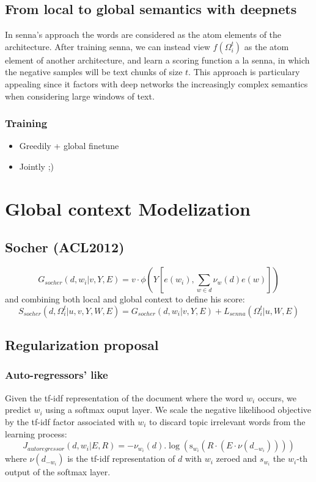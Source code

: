\documentclass[11pt]{article} %
\begin{document}
\subsection{From local to global  semantics with deepnets}
In senna's approach the words are considered as the atom elements of the architecture. After training senna, we can instead view $f(\Omega_i^t)$ as the atom element of another architecture, and learn a scoring function a la senna,
in which the negative samples will be text chunks of size $t$.
This approach is particulary appealing since it factors with deep networks the increasingly complex semantics when considering large windows of text.
\subsubsection{Training}
\begin{itemize}
\item Greedily + global finetune
\item Jointly ;)
\end{itemize}

\section{Global context Modelization}

\subsection{Socher (ACL2012)}
\[G_{socher}(d,w_i| v,Y,E) = v \cdot \phi\left(Y\left[e(w_i),\sum_{w\in d} \nu_w (d) e(w) \right] \right) \]
and combining both local and global context to define his score:
\[ S_{socher}(d, \Omega_{i}^t | u,v,Y,W,E) = G_{socher}(d,w_{i}| v,Y,E)  + L_{senna} \left(\Omega_{i}^t  | u,W,E\right) \]

\subsection{Regularization proposal}
\subsubsection{Auto-regressors' like}
Given the tf-idf representation of the document where the word $w_i$ occurs, we predict $w_i$ using a softmax ouput layer. 
We scale the negative likelihood objective by the tf-idf factor associated with $w_i$ to discard topic irrelevant words from the learning process:
\[
J_{autoregressor} (d,w_i|E,R) = -\nu_{w_i}(d) . \log\left( \mathrm{s}_{w_i}\left(R\cdot \left(E \cdot \nu\left(d_{-w_i}\right)\right)\right)\right)
\]
where $\nu\left(d_{-w_i}\right)$ is the tf-idf representation of $d$ with $w_i$ zeroed and $s_{w_i}$ the $w_i$-th output of the softmax layer.
\end{document}
